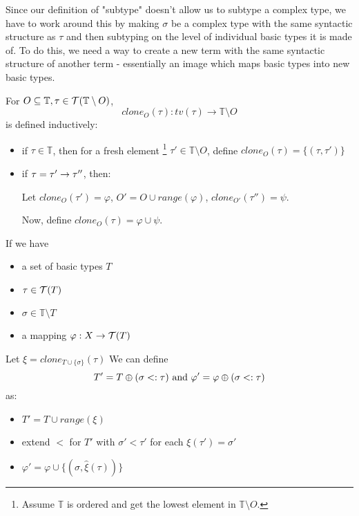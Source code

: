 \documentclass[main.tex]{subfiles}
\begin{document}
Since our definition of "subtype" doesn't allow us to subtype a complex type,
we have to work around this by making $\sigma$ be a complex type with the same
syntactic structure as $\tau$ and then subtyping on the level of individual
basic types it is made of. To do this, we need a way to create a new term
with the same syntactic structure of another term - essentially an image which
maps basic types into new basic types.

\begin{defn}
    For $O \subseteq \mathbb{T}, \tau \in \mathcal{T}( \mathbb{T} \setminus O )$,
    \[ clone_O(\tau) : tv(\tau) \rightarrow \mathbb{T} \setminus O \]
    is defined inductively:
    \begin{itemize}
        \item if $\tau \in \mathbb{T}$, then for a fresh element
            \footnote{Assume $\mathbb{T}$ is ordered and get the lowest element
            in $\mathbb{T} \setminus O$.}
            $\tau' \in \mathbb{T} \setminus O$, define
            $clone_O(\tau) = \{ (\tau, \tau') \}$
        \item if $\tau = \tau' \rightarrow \tau''$, then:

            Let $clone_O(\tau') = \varphi$, $O' = O \cup range(\varphi)$,
            $clone_{O'}(\tau'') = \psi$.

            Now, define $clone_O(\tau) = \varphi \cup \psi$.
    \end{itemize}
\end{defn}

\begin{defn}
    If we have
    \begin{itemize}
        \item a set of basic types $T$
        \item $\tau \in \mathcal{T}( T )$
        \item $\sigma \in \mathbb{T} \setminus T$
        \item a mapping $\varphi: X \rightarrow \mathcal{T}( T )$
    \end{itemize}
    Let $\xi = clone_{T \cup \{ \sigma \}}(\tau)$
    We can define \[ T' = T \oplus (\sigma <: \tau) \text{ and }
                     \varphi' = \varphi \oplus (\sigma <: \tau) \] as:
    \begin{itemize}
        \item $T' = T \cup range(\xi)$
        \item extend $\less$ for $T'$ with $\sigma' \less \tau'$ for each
            $\xi(\tau') = \sigma'$
        \item $\varphi' = \varphi \cup \{ (\sigma, \hat{\xi}(\tau)) \}$
    \end{itemize}
\end{defn}
\end{document}
